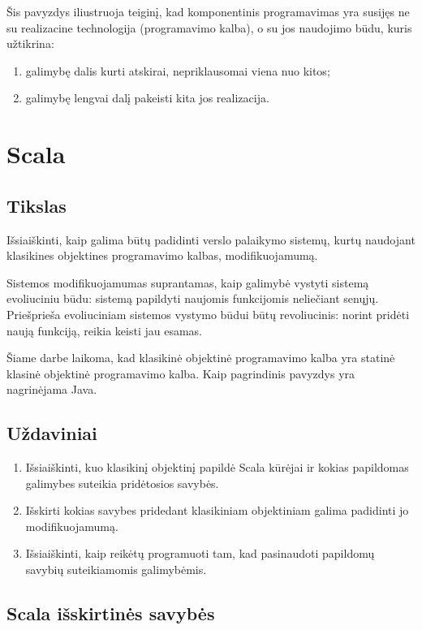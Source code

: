 Šis pavyzdys iliustruoja teiginį, kad komponentinis programavimas yra
susijęs ne su realizacine technologija (programavimo kalba), o su
jos naudojimo būdu, kuris užtikrina:
\begin{enumerate}
  \item galimybę dalis kurti atskirai, nepriklausomai viena nuo kitos;
  \item galimybę lengvai dalį pakeisti kita jos realizacija.
\end{enumerate}

\chapter{Scala}

\section{Tikslas}

Išsiaiškinti, kaip galima būtų padidinti verslo palaikymo sistemų, kurtų
naudojant klasikines objektines programavimo kalbas, modifikuojamumą.

Sistemos modifikuojamumas suprantamas, kaip galimybė vystyti sistemą
evoliuciniu būdu: sistemą papildyti naujomis funkcijomis neliečiant
senųjų. Priešprieša evoliuciniam sistemos vystymo būdui būtų
revoliucinis: norint pridėti naują funkciją, reikia keisti jau
esamas.

Šiame darbe laikoma, kad klasikinė objektinė programavimo kalba
yra statinė klasinė objektinė programavimo kalba. Kaip pagrindinis
pavyzdys yra nagrinėjama Java.

\section{Uždaviniai}

\begin{enumerate}
  \item Išsiaiškinti, kuo klasikinį objektinį papildė Scala
    kūrėjai ir kokias papildomas galimybes suteikia pridėtosios
    savybės.
  \item Išskirti kokias savybes pridedant klasikiniam objektiniam
    galima padidinti jo modifikuojamumą.
  \item Išsiaiškinti, kaip reikėtų programuoti tam, kad pasinaudoti
    papildomų savybių suteikiamomis galimybėmis.
\end{enumerate}

\section{Scala išskirtinės savybės}

